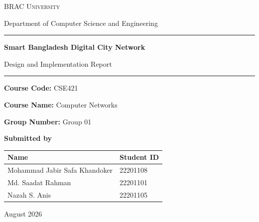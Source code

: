 \documentclass[11pt,a4paper]{article}
\begin{document}
\begin{titlepage}
\centering
\vspace*{6mm}


{\LARGE\scshape BRAC University\par}
\vspace{5mm}
{\large Department of Computer Science and Engineering\par}

\vspace{26mm}
{\color{navy}\rule{\linewidth}{1.2pt}}
\vspace{8mm}

{\huge\bfseries Smart Bangladesh Digital City Network\par}
\vspace{6mm}
{\Large Design and Implementation Report\par}

\vspace{8mm}
{\color{navy}\rule{\linewidth}{1.2pt}}

\vspace{20mm}
{\large \textbf{Course Code:} CSE421 \par}
\vspace{3mm}
{\large \textbf{Course Name:} Computer Networks \par}
\vspace{3mm}
{\large \textbf{Group Number:} Group 01 \par}

\vspace{18mm}
{\large\bfseries Submitted by\par}
\vspace{5mm}

\begin{tabular}{@{}p{75mm}p{35mm}@{}}
\toprule
\textbf{Name} & \textbf{Student ID} \\
\midrule
Mohammad Jabir Safa Khandoker   & 22201108 \\
Md. Saadat Rahman   & 22201101 \\
Nazah S. Anis & 22201105 \\
\bottomrule
\end{tabular}

\vfill
{\large August 2026\par}
\vspace{4mm}
\end{titlepage}
\end{document}
